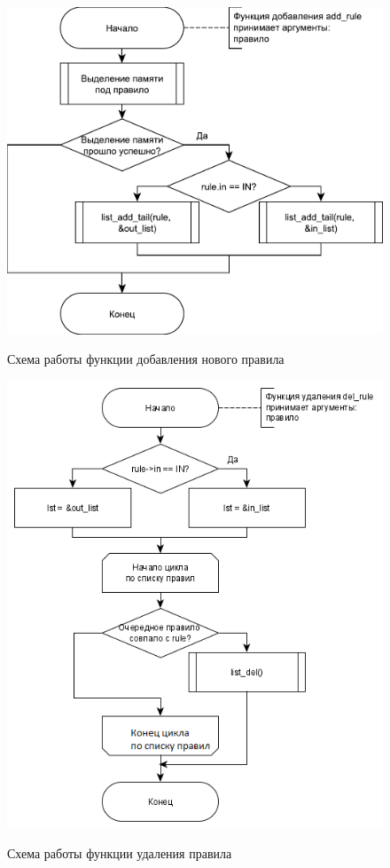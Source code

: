 \begin{figure}[h!]
	\begin{center}
		{\includegraphics[scale = 0.6]{img/add_rule.pdf}}
		\caption{Схема работы функции добавления нового правила}
		\label{fig7:image}
	\end{center}
\end{figure}

\begin{figure}[h!]
	\begin{center}
		{\includegraphics[scale = 0.7]{img/del_rule.png}}
		\caption{Схема работы функции удаления правила}
		\label{fig8:image}
	\end{center}
\end{figure}

